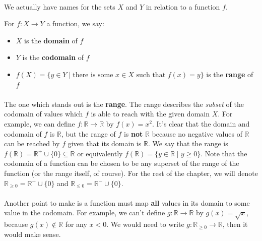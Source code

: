 \documentclass[12pt, a4paper, titlepage, twoside]{article}
\newcommand*{\R}{\mathbb{R}}
\begin{document}
	\paragraph{}
	We actually have names for the sets $X$ and $Y$ in relation to a function $f$.\\
	
	\begin{kp}
		For $f : X \to Y$ a function, we say:
		\begin{itemize}
			\item $X$ is the \textbf{domain} of $f$
			\item $Y$ is the \textbf{codomain} of $f$
			\item $f(X) = \{ y \in Y \; \vert \; \text{there is some } x \in X \text{ such that } f(x) = y \}$
			is the \textbf{range} of $f$
		\end{itemize}
	\end{kp}
	
	\paragraph{}
	The one which stands out is the \textbf{range}. The range describes the \textit{subset} of the codomain of values which $f$ is able to
	reach with the given domain $X$. For example, we can define $f : \R \to \R$ by $f(x) = x^2$. It's clear that the domain and codomain of $f$ is
	$\R$, but the range of $f$ is \textbf{not} $\R$ because no negative values of $\R$ can be reached by $f$ given that its domain is $\R$.
	We say that the range is $f(\R) = \R^+ \cup \{0\} \subseteq \R$ or equivalently $f(\R) = \{ y \in \R \; \vert \; y \geqslant 0 \}$. Note that
	the codomain of a function can be chosen to be any superset of the range of the function (or the range itself, of course). For the rest of
	the chapter, we will denote $\R_{\geqslant 0} = \R^+ \cup \{0\}$ and $\R_{\leqslant 0} = \R^- \cup \{0\}$.
	
	\paragraph{}
	Another point to make is a function must map \textbf{all} values in its domain to some value in the codomain. For example, we can't define
	$g : \R \to \R$ by $g(x) = \sqrt{x}$, because $g(x) \not\in \R$ for any $x < 0$. We would need to write $g : \R_{\geqslant 0}  \to \R$, then it
	would make sense.\\
	
\end{document}
